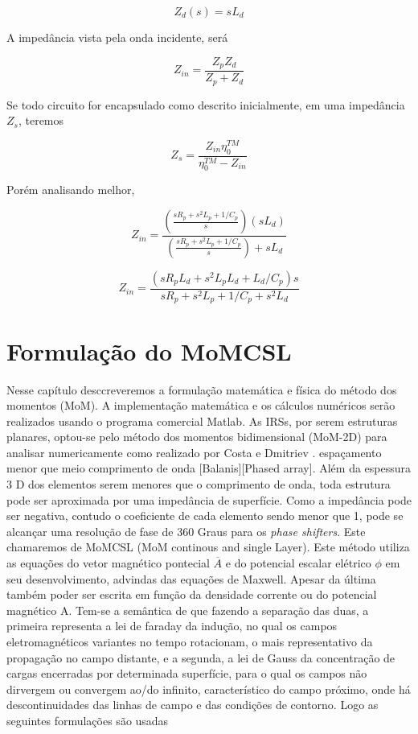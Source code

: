 \documentclass[
	12pt,				%
	openright,			%
	oneside,			%
	a4paper,			%
	english,			%
	brazil				%
	]{abntex2}
\begin{document}
\begin{equation}
Z_d(s)=s L_d
\end{equation}
 
A impedância vista pela onda incidente, será

\begin{equation}
   Z_{in}= \frac{Z_p Z_d}{Z_p+Z_d}
\end{equation}


Se todo circuito for encapsulado como descrito inicialmente, em uma impedância $Z_s$, teremos

\begin{equation}
    Z_s=\frac{Z_{in}\eta_0^{TM}}{\eta_0^{TM}-Z_{in}}
\end{equation}

Porém analisando melhor,

\begin{equation}
   Z_{in}= \frac
   {(\frac{sR_p+s^2 L_p+1/C_p}{s }) (sL_d)
   }
   {
  (\frac{sR_p+s^2 L_p+1/C_p}{s })+sL_d
   }
\end{equation}

\begin{equation}
   Z_{in}= \frac
   {
      (sR_p L_d+s^2 L_pL_d+L_d/C_p)s
   }
   {
      sR_p+s^2 L_p+1/C_p+s^2L_d
   }
\end{equation}

\chapter{Formulação do MoMCSL}\label{FormulaçãoMoMCSL}


Nesse capítulo desccreveremos a formulação matemática e física do método dos momentos (MoM). A implementação matemática e os cálculos numéricos serão realizados usando o programa comercial Matlab. As IRSs, por serem estruturas planares, optou-se pelo método dos momentos bidimensional (MoM-2D) para analisar numericamente como realizado por Costa e Dmitriev . 
espaçamento menor que meio comprimento de onda [Balanis][Phased array]. Além da espessura 3 D dos elementos serem menores que o comprimento de onda, toda estrutura pode ser aproximada por uma impedância de superfície. Como a impedância pode ser negativa, contudo o coeficiente de cada elemento sendo menor que 1, pode se alcançar uma resolução de fase de 360 Graus para os  \emph{phase shifters}. Este chamaremos de MoMCSL (MoM continous and single Layer). Este método utiliza as equações do vetor magnético pontecial $\overline{A}$ e do potencial escalar elétrico $\phi$ em seu desenvolvimento, advindas das equações de Maxwell. Apesar da última também poder ser escrita em função da densidade corrente ou do potencial magnético A. Tem-se a semântica de que fazendo a separação das duas, a primeira representa a lei de faraday da indução, no qual os campos eletromagnéticos variantes no tempo rotacionam, o mais representativo da propagação no campo distante, e a segunda, a lei de Gauss da concentração de cargas encerradas por determinada superfície, para o qual os campos não dirvergem ou convergem ao/do infinito, característico do campo próximo, onde há descontinuidades das linhas de campo e das condições de contorno. Logo as seguintes formulações são usadas
\end{document}
